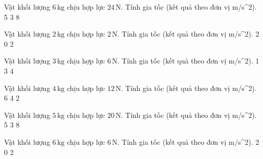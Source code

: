 \begin{ex}
Vật khối lượng $6\,\text{kg}$ chịu hợp lực $24\,\text{N}$. Tính gia tốc (kết quả theo đơn vị m/s^2).
\choice
{}
{5}
{3}
{8}
\end{ex}

\begin{ex}
Vật khối lượng $2\,\text{kg}$ chịu hợp lực $2\,\text{N}$. Tính gia tốc (kết quả theo đơn vị m/s^2).
\choice
{2}
{}
{0}
{2}
\end{ex}

\begin{ex}
Vật khối lượng $3\,\text{kg}$ chịu hợp lực $6\,\text{N}$. Tính gia tốc (kết quả theo đơn vị m/s^2).
\choice
{1}
{3}
{}
{4}
\end{ex}

\begin{ex}
Vật khối lượng $4\,\text{kg}$ chịu hợp lực $12\,\text{N}$. Tính gia tốc (kết quả theo đơn vị m/s^2).
\choice
{6}
{4}
{2}
{}
\end{ex}

\begin{ex}
Vật khối lượng $5\,\text{kg}$ chịu hợp lực $20\,\text{N}$. Tính gia tốc (kết quả theo đơn vị m/s^2).
\choice
{}
{5}
{3}
{8}
\end{ex}

\begin{ex}
Vật khối lượng $6\,\text{kg}$ chịu hợp lực $6\,\text{N}$. Tính gia tốc (kết quả theo đơn vị m/s^2).
\choice
{2}
{}
{0}
{2}
\end{ex}

